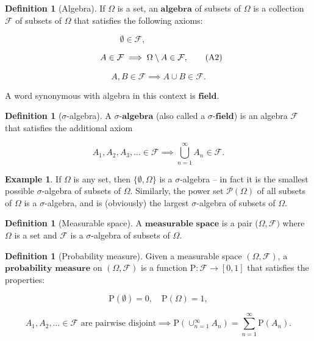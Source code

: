 \documentclass[11pt]{report}
\providecommand{\cal}{\mathcal}
\theoremstyle{plain}
\theoremstyle{definition}
\newtheorem{defn}[thm]{Definition}
\newtheorem{example}[thm]{Example}
\begin{document}
\begin{defn}[Algebra]
If $\Omega$ is a set, an $\textbf{algebra}$ of
subsets of $\Omega$ is a collection ${\cal F}$ of
subsets of $\Omega$ that satisfies the following
axioms:

\begin{equation*}
\emptyset \in {\cal F},  \tag{A1}\qquad\qquad\qquad
\end{equation*}

\begin{equation*}
 \ \ A \in {\cal F} \implies \Omega\setminus A \in {\cal F}, \tag{A2} \\
\end{equation*}

\begin{equation*}
A,B \in {\cal F} \implies A\cup B \in {\cal F}.  \tag{A3}
\end{equation*}

A word synonymous with algebra in this context is
$\textbf{field}$.
\end{defn}

\begin{defn}[$\sigma$-algebra]
A  $\textbf{$\sigma$-algebra}$ (also called a
$\textbf{$\sigma$-field}$) is an algebra ${\cal F}$
that satisfies the additional axiom

\begin{equation*}
A_1, A_2, A_3, \ldots \in \mathcal{F}
\implies
\bigcup_{n=1}^{\infty} A_n \in \mathcal{F}.
\tag{A4}
\end{equation*}

\end{defn}

\begin{example}
If $\Omega$ is any set, then $\{ \emptyset, \Omega \}$
is a $\sigma$-algebra -- in fact it is the smallest
possible $\sigma$-algebra of subsets of $\Omega$.
Similarly, the power set ${\cal P}(\Omega)$ of all
subsets of $\Omega$ is a $\sigma$-algebra, and is
(obviously) the largest $\sigma$-algebra of subsets
of $\Omega$.
\end{example}

\begin{defn}[Measurable space]
A $\textbf{measurable space}$ is a pair
($\Omega,{\cal F})$ where $\Omega$ is a set and
${\cal F}$ is a $\sigma$-algebra of subsets of
$\Omega$.
\end{defn}

\begin{defn}[Probability measure]
Given a measurable space $(\Omega, {\cal F})$, a
$\textbf{probability measure}$ on $(\Omega, {\cal F})$
is a function $\mathrm{P}:{\cal F}\to[0,1]$ that
satisfies the properties:

\begin{equation*}
\mathrm{P}(\emptyset) = 0, \quad \mathrm{P}(\Omega) = 1,
\tag{P1}
\end{equation*}

\begin{equation*}
A_1, A_2, \ldots \in {\cal F}\textrm{ are pairwise disjoint} \implies
\mathrm{P}(\cup_{n=1}^\infty A_n) = \sum_{n=1}^\infty \mathrm{P}(A_n).
\tag{P2}
\end{equation*}

\end{defn}
\end{document}
